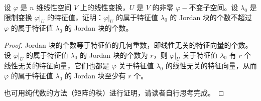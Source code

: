 \documentclass[../../main.tex]{subfiles}%
\begin{document}
\begin{proposition}\label{proposition:限制变换的任一Jordan块的个数一定小于原线性变换的特征值对应的Jordan块的个数}
设 \(\varphi\) 是 \(n\) 维线性空间 \(V\) 上的线性变换，\(U\) 是 \(V\) 的非零 \(\varphi -\)不变子空间。设 \(\lambda_0\) 是限制变换 \(\varphi|_U\) 的特征值，证明：\(\varphi|_U\) 的属于特征值 \(\lambda_0\) 的 Jordan 块的个数不超过 \(\varphi\) 的属于特征值 \(\lambda_0\) 的 Jordan 块的个数。
\end{proposition}
\begin{proof}
Jordan 块的个数等于特征值的几何重数，即线性无关的特征向量的个数。设 \(\varphi|_U\) 的属于特征值 \(\lambda_0\) 的 Jordan 块的个数为 \(r\)，则 \(\varphi|_U\) 关于特征值 \(\lambda_0\) 有 \(r\) 个线性无关的特征向量，它们也都是 \(\varphi\) 关于特征值 \(\lambda_0\) 的线性无关的特征向量，从而 \(\varphi\) 的属于特征值 \(\lambda_0\) 的 Jordan 块至少有 \(r\) 个。

也可用纯代数的方法（矩阵的秩）进行证明，请读者自行思考完成。
\end{proof}
\end{document}
